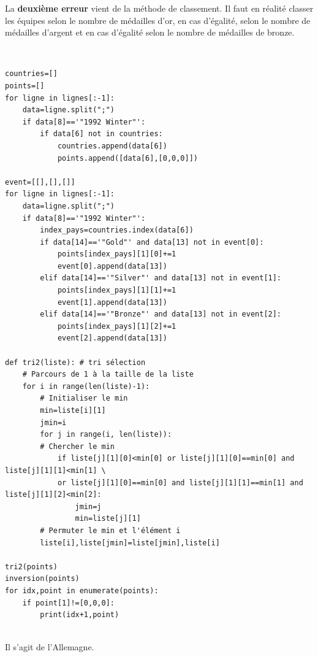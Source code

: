 La \textbf{deuxième erreur} vient de la méthode de classement. Il faut en réalité classer les équipes selon le nombre de médailles d'or, en cas d'égalité, selon le nombre de médailles d'argent et en cas d'égalité selon le nombre de médailles de bronze.



\begin{solution}~\ \\
\begin{verbatim}
countries=[]
points=[]
for ligne in lignes[:-1]:
    data=ligne.split(";")
    if data[8]=='"1992 Winter"':
        if data[6] not in countries:
            countries.append(data[6])
            points.append([data[6],[0,0,0]])

event=[[],[],[]]            
for ligne in lignes[:-1]:
    data=ligne.split(";")
    if data[8]=='"1992 Winter"':
        index_pays=countries.index(data[6])
        if data[14]=='"Gold"' and data[13] not in event[0]:
            points[index_pays][1][0]+=1
            event[0].append(data[13])
        elif data[14]=='"Silver"' and data[13] not in event[1]:
            points[index_pays][1][1]+=1
            event[1].append(data[13])
        elif data[14]=='"Bronze"' and data[13] not in event[2]:
            points[index_pays][1][2]+=1
            event[2].append(data[13])

def tri2(liste): # tri sélection
    # Parcours de 1 à la taille de la liste
    for i in range(len(liste)-1):
        # Initialiser le min
        min=liste[i][1]
        jmin=i
        for j in range(i, len(liste)):
        # Chercher le min
            if liste[j][1][0]<min[0] or liste[j][1][0]==min[0] and liste[j][1][1]<min[1] \
            or liste[j][1][0]==min[0] and liste[j][1][1]==min[1] and liste[j][1][2]<min[2]:
                jmin=j
                min=liste[j][1]
        # Permuter le min et l'élément i
        liste[i],liste[jmin]=liste[jmin],liste[i]
    
tri2(points)
inversion(points)
for idx,point in enumerate(points):
    if point[1]!=[0,0,0]:
        print(idx+1,point)
\end{verbatim}
\end{solution}


\begin{solution}~\ \\
Il s'agit de l'Allemagne.
\end{solution}






